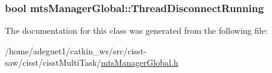 \hypertarget{classmts_manager_global_a37a0b3f81f160ab240bb99924f52bf26}{
\subsubsection[{Thread\-Disconnect\-Running}]{\setlength{\rightskip}{0pt plus 5cm}bool mts\-Manager\-Global\-::\-Thread\-Disconnect\-Running\hspace{0.3cm}{\ttfamily [protected]}}}\label{classmts_manager_global_a37a0b3f81f160ab240bb99924f52bf26}


The documentation for this class was generated from the following file\-:\begin{DoxyCompactItemize}
\item 
/home/adeguet1/catkin\-\_\-ws/src/cisst-\/saw/cisst/cisst\-Multi\-Task/\hyperlink{mts_manager_global_8h}{mts\-Manager\-Global.\-h}\end{DoxyCompactItemize}
